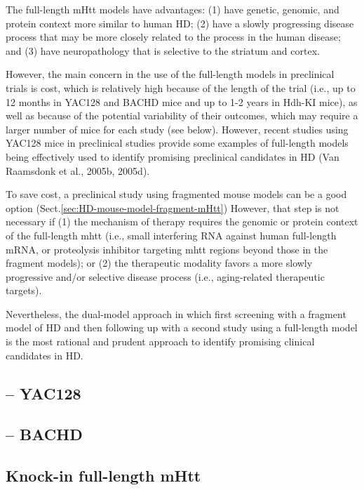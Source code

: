 \begin{mdframed}

The full-length mHtt models have advantages: 
(1) have genetic, genomic, and protein context more similar to human HD; (2)
have a slowly progressing disease process that may be more closely related to
the process in the human disease; and (3) have neuropathology that is selective
to the striatum and cortex. 

However, the main concern in the use of the full-length models in preclinical
trials is cost, which is relatively high because of the length of the trial
(i.e., up to 12 months in YAC128 and BACHD mice and up to 1-2 years in Hdh-KI
mice), as well as because of the potential variability of their outcomes, which
may require a larger number of mice for each study (see below). However, recent
studies using YAC128 mice in preclinical studies provide some examples of
full-length models being effectively used to identify promising preclinical
candidates in HD (Van Raamsdonk et al., 2005b, 2005d).

To save cost, a preclinical study using fragmented mouse models can be a good
option (Sect.\ref{sec:HD-mouse-model-fragment-mHtt}) However, that step is not
necessary if (1) the mechanism of therapy requires the genomic or protein
context of the full-length mhtt (i.e., small interfering RNA against human
full-length mRNA, or proteolysis inhibitor targeting mhtt regions beyond those
in the fragment models); or (2) the therapeutic modality favors a more slowly
progressive and/or selective disease process (i.e., aging-related therapeutic
targets).

Nevertheless, the dual-model approach in which first screening with a fragment
model of HD and then following up with a second study using a full-length model
is the most rational and prudent approach to identify promising clinical
candidates in HD.

\end{mdframed}

\subsection{-- YAC128}

\subsection{-- BACHD}

\subsection{Knock-in full-length mHtt}
\label{sec:HD-mouse-model-full-length-mHtt-Knock-in}

